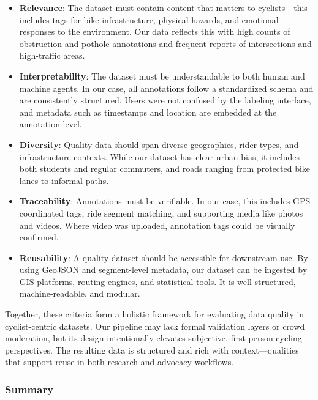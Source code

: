 \begin{itemize}
\item \textbf{Relevance}: The dataset must contain content that matters to cyclists—this includes tags for bike infrastructure, physical hazards, and emotional responses to the environment. Our data reflects this with high counts of obstruction and pothole annotations and frequent reports of intersections and high-traffic areas.

\item \textbf{Interpretability}: The dataset must be understandable to both human and machine agents. In our case, all annotations follow a standardized schema and are consistently structured. Users were not confused by the labeling interface, and metadata such as timestamps and location are embedded at the annotation level.

\item \textbf{Diversity}: Quality data should span diverse geographies, rider types, and infrastructure contexts. While our dataset has clear urban bias, it includes both students and regular commuters, and roads ranging from protected bike lanes to informal paths.

\item \textbf{Traceability}: Annotations must be verifiable. In our case, this includes GPS-coordinated tags, ride segment matching, and supporting media like photos and videos. Where video was uploaded, annotation tags could be visually confirmed.

\item \textbf{Reusability}: A quality dataset should be accessible for downstream use. By using GeoJSON and segment-level metadata, our dataset can be ingested by GIS platforms, routing engines, and statistical tools. It is well-structured, machine-readable, and modular.
\end{itemize}

Together, these criteria form a holistic framework for evaluating data quality in cyclist-centric datasets. Our pipeline may lack formal validation layers or crowd moderation, but its design intentionally elevates subjective, first-person cycling perspectives. The resulting data is structured and rich with context—qualities that support reuse in both research and advocacy workflows.

\subsubsection{Summary}

